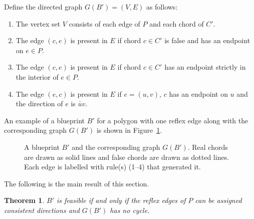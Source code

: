 \documentclass{elsart}
\newtheorem{theorem}{Theorem}
\begin{document}
Define the directed graph $G(B')=(V,E)$ as follows:

\begin{enumerate}
\item The vertex set $V$ consists of each edge of $P$ and each chord
  of $C'$.
\item The edge $(c,e)$ is present in $E$ if chord $c\in C'$ is
  false and has an endpoint on $e\in P$.
\item The edge $(c,e)$ is present in $E$ if chord $c\in C'$
  has an endpoint strictly in the interior of $e\in P$.
\item The edge $(e,c)$ is present in $E$ if $e=(u,v)$, $c$ has an
  endpoint on $u$ and the direction of $e$ is $\overleftarrow{uv}$.
\end{enumerate}

An example of a blueprint $B'$ for a polygon with one reflex edge
along with the corresponding graph $G(B')$ is shown in
Figure~\ref{fig:graph}.

\begin{figure}
  \begin{center}
  \end{center}
  \caption{A blueprint $B'$ and the corresponding graph $G(B')$.  Real chords are drawn as solid lines and false chords are drawn as dotted lines.  Each edge is labelled with rule(s) (1--4) that generated it.}
  \label{fig:graph}
\end{figure}

The following is the main result of this section.

\begin{theorem}\label{thm:testing}
  $B'$ is feasible if and only if the reflex edges of $P$ can be
  assigned consistent directions and $G(B')$ has no cycle.
\end{theorem}
\end{document}
